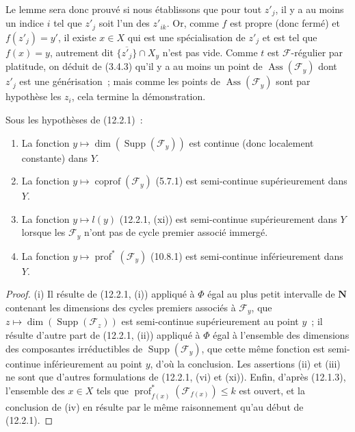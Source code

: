 \begin{env}[12.2.1.3]
Le lemme sera donc prouvé si nous établissons que pour tout $z'_j$, il y a au
moins un indice $i$ tel que $z'_j$ soit l'un des $z'_{ik}$. Or, comme $f$ est
propre (donc fermé) et $f(z'_j)=y'$, il existe $x\in X$ qui est une
spécialisation de $z'_j$ et est tel que $f(x)=y$, autrement dit
$\overline{\{z'_j\}}\cap X_y$ n'est pas vide. Comme $t$ est
$\mathcal F$-régulier par platitude, on déduit de (3.4.3) qu'il y a au moins un
point de $\operatorname{Ass}(\mathcal F_y)$ dont $z'_j$ est une
générisation~; mais comme les points de $\operatorname{Ass}(\mathcal F_y)$
sont par hypothèse les $z_i$, cela termine la démonstration.
\end{env}

\begin{corollary}[12.2.2]
\label{IV.12.2.2-fr}
Sous les hypothèses de (12.2.1)~:
\begin{enumerate}[label=(\roman*)]
  \item La fonction $y\mapsto\dim(\operatorname{Supp}(\mathcal F_y))$ est
  continue (donc localement constante) dans $Y$.
  \item La fonction $y\mapsto\operatorname{coprof}(\mathcal F_y)$ (5.7.1) est
  semi-continue supérieurement dans $Y$.
  \item La fonction $y\mapsto l(y)$ (12.2.1, (xi)) est semi-continue
  supérieurement dans $Y$ lorsque les $\mathcal F_y$ n'ont pas de cycle
  premier associé immergé.
  \item La fonction $y\mapsto\operatorname{prof}^{*}(\mathcal F_y)$ (10.8.1)
  est semi-continue inférieurement dans $Y$.
\end{enumerate}
\end{corollary}

\begin{proof}
(i) Il résulte de (12.2.1, (i)) appliqué à $\Phi$ égal au plus petit intervalle de
$\mathbf N$ contenant les dimensions des cycles premiers associés à
$\mathcal F_y$, que $z\mapsto\dim(\operatorname{Supp}(\mathcal F_z))$ est
semi-continue supérieurement au point $y$~; il résulte d'autre part de
(12.2.1, (ii)) appliqué à $\Phi$ égal à l'ensemble des dimensions des
composantes irréductibles de $\operatorname{Supp}(\mathcal F_y)$, que cette
même fonction est semi-continue inférieurement au point $y$, d'où la
conclusion. Les assertions (ii) et (iii) ne sont que d'autres formulations de
(12.2.1, (vi) et (xi)). Enfin, d'après (12.1.3), l'ensemble des $x\in X$ tels
que $\operatorname{prof}^{*}_{f(x)}(\mathcal F_{f(x)})\leq k$ est ouvert, et la
conclusion de (iv) en résulte par le même raisonnement qu'au début de (12.2.1).
\end{proof}

